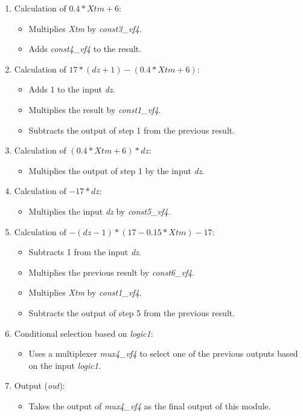 \begin{enumerate}

\item Calculation of $0.4 * Xtm + 6$:
\begin{itemize}
\item Multiplies \textit{Xtm} by \textit{const3\_vf4}.
\item Adds \textit{const4\_vf4} to the result.
\end{itemize}

\item Calculation of  $17 * (dz + 1) - (0.4 * Xtm + 6)$:
\begin{itemize}
\item Adds 1 to the input \textit{dz}.
\item Multiplies the result by \textit{const1\_vf4}.
\item Subtracts the output of step 1 from the previous result.
\end{itemize}

\item Calculation of  $(0.4 * Xtm + 6) * dz$:
\begin{itemize}
\item Multiplies the output of step 1 by the input \textit{dz}.
\end{itemize}

\item Calculation of  $-17 * dz$:
\begin{itemize}
\item Multiplies the input \textit{dz} by \textit{const5\_vf4}.
\end{itemize}

\item Calculation of  $-(dz - 1) * (17 - 0.15 * Xtm) - 17$:
\begin{itemize}
\item Subtracts 1 from the input \textit{dz}.
\item Multiplies the previous result by \textit{const6\_vf4}.
\item Multiplies \textit{Xtm} by \textit{const1\_vf4}.
\item Subtracts the output of step 5 from the previous result.
\end{itemize}

\item Conditional selection based on \textit{logic1}:
\begin{itemize}
\item Uses a multiplexer \textit{mux4\_vf4} to select one of the previous outputs based on the input \textit{logic1}.
\end{itemize}

\item Output (\textit{out}):
\begin{itemize}
\item Takes the output of \textit{mux4\_vf4} as the final output of this module.
\end{itemize}

\end{enumerate}


